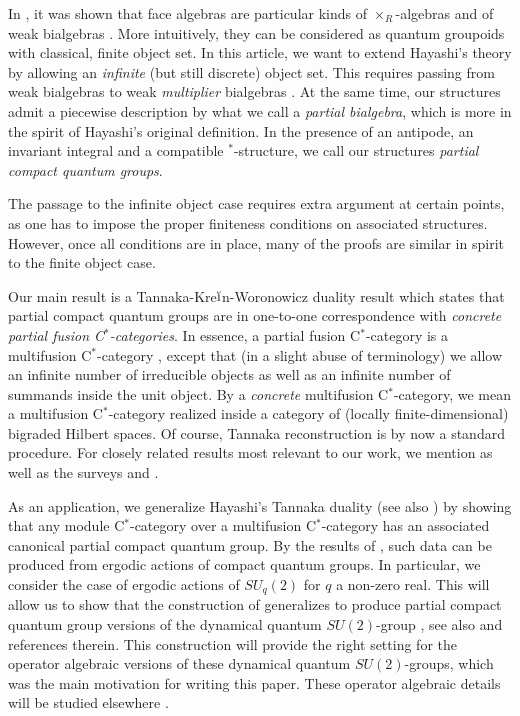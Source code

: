 \documentclass[10pt]{article}
\theoremstyle{definition}
\numberwithin{equation}{section}
\begin{document}
In \cite{Nil1,Sch1,Sch2}, it was shown that face algebras are particular kinds of $\times_R$-algebras \cite{Tak2} and of weak bialgebras \cite{Boh3,BCJ,Nik1}. More intuitively, they can be considered as quantum groupoids with  classical, finite object set. In this article, we want to extend Hayashi's theory by allowing an \emph{infinite} (but still discrete) object set. This requires passing from weak bialgebras to weak \emph{multiplier} bialgebras \cite{Boh1}. At the same time, our structures admit a piecewise description by what we call a \emph{partial bialgebra}, which is more in the spirit of Hayashi's original definition. In the presence of an antipode, an invariant integral and a compatible $^*$-structure, we call our structures \emph{partial compact quantum groups}. 

The passage to the infinite object case requires extra argument at certain points, as one has to impose the proper finiteness conditions on associated structures. However, once all conditions are in place, many of the proofs are similar in spirit to the finite object case. 

Our main result is a Tannaka-Kre$\breve{\textrm{\i}}$n-Woronowicz duality result which states that partial compact quantum groups are in one-to-one correspondence with \emph{concrete partial fusion C$^*$-categories}. In essence, a partial fusion C$^*$-category is a multifusion C$^*$-category \cite{ENO1}, except that (in a slight abuse of terminology) we allow an infinite number of irreducible objects as well as an infinite number of summands inside the unit object. By a \emph{concrete} multifusion C$^*$-category, we mean a multifusion C$^*$-category realized inside a category of (locally finite-dimensional) bigraded Hilbert spaces. Of course, Tannaka reconstruction is by now a standard procedure. For closely related results most relevant to our work, we mention \cite{Wor2,Sch3,Hay8,Ost1,Hai1,Szl1,Pfe1,DCY1,Nes1} as well as the surveys \cite{JoS1} and \cite[Section 2.3]{NeT1}.

As an application, we generalize Hayashi's Tannaka duality \cite{Hay8} (see also \cite{Ost1}) by showing that any module C$^*$-category over a multifusion C$^*$-category has an associated canonical partial compact quantum group. By the results of \cite{DCY1}, such data can be produced from ergodic actions of compact quantum groups. In particular,  we consider the case of ergodic actions of $SU_q(2)$ for $q$ a non-zero real. This will allow us to show that the construction of \cite{Hay1} generalizes to produce partial compact quantum group versions of the dynamical quantum $SU(2)$-group \cite{EtV1,KoR1}, see also \cite{Sto1} and references therein. This construction will provide the right setting for the operator algebraic versions of these dynamical quantum $SU(2)$-groups, which was the main motivation for writing this paper. These operator algebraic details will be studied elsewhere \cite{DCT2}.
\end{document}
